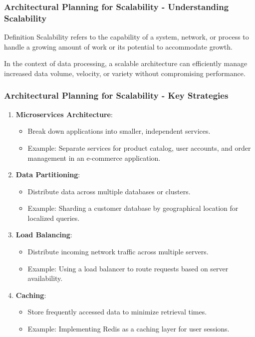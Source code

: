 \documentclass[aspectratio=169]{beamer}
\begin{document}
\begin{frame}[fragile]
    \frametitle{Architectural Planning for Scalability - Understanding Scalability}
    \begin{block}{Definition}
        Scalability refers to the capability of a system, network, or process to handle a growing amount of work or its potential to accommodate growth.
    \end{block}
    In the context of data processing, a scalable architecture can efficiently manage increased data volume, velocity, or variety without compromising performance.
\end{frame}

\begin{frame}[fragile]
    \frametitle{Architectural Planning for Scalability - Key Strategies}
    \begin{enumerate}
        \item \textbf{Microservices Architecture}:
        \begin{itemize}
            \item Break down applications into smaller, independent services.
            \item Example: Separate services for product catalog, user accounts, and order management in an e-commerce application.
        \end{itemize}
        
        \item \textbf{Data Partitioning}:
        \begin{itemize}
            \item Distribute data across multiple databases or clusters.
            \item Example: Sharding a customer database by geographical location for localized queries.
        \end{itemize}
        
        \item \textbf{Load Balancing}:
        \begin{itemize}
            \item Distribute incoming network traffic across multiple servers.
            \item Example: Using a load balancer to route requests based on server availability.
        \end{itemize}
        
        \item \textbf{Caching}:
        \begin{itemize}
            \item Store frequently accessed data to minimize retrieval times.
            \item Example: Implementing Redis as a caching layer for user sessions.
        \end{itemize}


\end{enumerate}
\end{frame}
\end{document}
